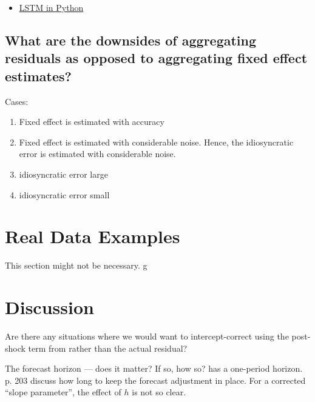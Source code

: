 \documentclass[11pt]{article}
\theoremstyle{definition}
\begin{document}
\begin{itemize}
  \item \href{https://machinelearningmastery.com/time-series-prediction-lstm-recurrent-neural-networks-python-keras/}{LSTM in Python}
\end{itemize}

\subsection{What are the downsides of aggregating residuals as opposed to aggregating fixed effect estimates?}

Cases:
\begin{enumerate}
  \item Fixed effect is estimated with accuracy 
  \item Fixed effect is estimated with considerable noise.  Hence, the idiosyncratic error is estimated with considerable noise.
  \item idiosyncratic error large
  \item idiosyncratic error small
\end{enumerate}  


\section{Real Data Examples}
This section might not be necessary.
g\section{Discussion}

Are there any situations where we would want to intercept-correct using the post-shock term from \cite{lin2021minimizing} rather than the actual residual?

The forecast horizon --- does it matter?  If so, how so?  \cite{lin2021minimizing} has a one-period horizon.  \cite{clements1998forecasting}{p. 203} discuss how long to keep the forecast adjustment in place.  For a corrected ``slope parameter'', the effect of $h$ is not so clear.\\
\end{document}
